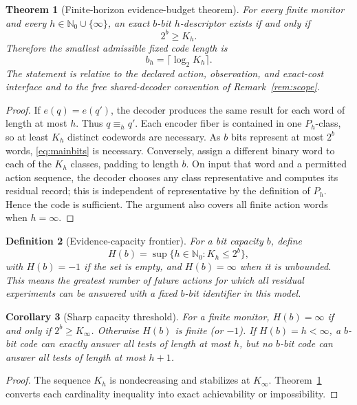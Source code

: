 \documentclass[11pt,letterpaper]{article}
\newtheorem{theorem}{Theorem}[section]
\newtheorem{corollary}[theorem]{Corollary}
\newtheorem{definition}[theorem]{Definition}
\newcommand{\Nzero}{\mathbb{N}_0}
\newcommand{\eqk}[1]{\equiv_{#1}}
\begin{document}
\begin{theorem}[Finite-horizon evidence-budget theorem]\label{thm:bits}
For every finite monitor and every $h\in\Nzero\cup\{\infty\}$, an exact $b$-bit $h$-descriptor exists if and only if
\begin{equation}\label{eq:mainbits}
 2^b\ge K_h.
\end{equation}
Therefore the smallest admissible fixed code length is
\[
 b_h=\lceil\log_2 K_h\rceil.
\]
The statement is relative to the declared action, observation, and exact-cost interface and to the free shared-decoder convention of Remark~\ref{rem:scope}.
\end{theorem}
\begin{proof}
If $e(q)=e(q')$, the decoder produces the same result for each word of length at most $h$. Thus $q\eqk{h}q'$. Each encoder fiber is contained in one $P_h$-class, so at least $K_h$ distinct codewords are necessary. As $b$ bits represent at most $2^b$ words, \eqref{eq:mainbits} is necessary. Conversely, assign a different binary word to each of the $K_h$ classes, padding to length $b$. On input that word and a permitted action sequence, the decoder chooses any class representative and computes its residual record; this is independent of representative by the definition of $P_h$. Hence the code is sufficient. The argument also covers all finite action words when $h=\infty$.
\end{proof}

\begin{definition}[Evidence-capacity frontier]\label{def:frontier}
For a bit capacity $b$, define
\[
 H(b)=\sup\bigl\{h\in\Nzero:K_h\le2^b\bigr\},
\]
with $H(b)=-1$ if the set is empty, and $H(b)=\infty$ when it is unbounded. This means the greatest number of future actions for which \emph{all} residual experiments can be answered with a fixed $b$-bit identifier in this model.
\end{definition}

\begin{corollary}[Sharp capacity threshold]\label{cor:capacity}
For a finite monitor, $H(b)=\infty$ if and only if $2^b\ge K_\infty$. Otherwise $H(b)$ is finite (or $-1$). If $H(b)=h<\infty$, a $b$-bit code can exactly answer all tests of length at most $h$, but no $b$-bit code can answer all tests of length at most $h+1$.
\end{corollary}
\begin{proof}
The sequence $K_h$ is nondecreasing and stabilizes at $K_\infty$. Theorem~\ref{thm:bits} converts each cardinality inequality into exact achievability or impossibility.
\end{proof}
\end{document}
